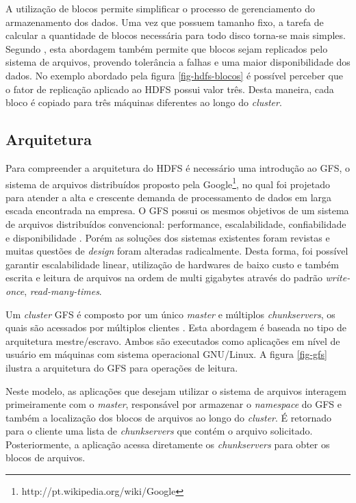 A utilização de blocos permite simplificar o processo de gerenciamento do armazenamento dos dados. Uma vez que possuem tamanho fixo, a tarefa de calcular a quantidade de blocos necessária para todo disco torna-se mais simples. Segundo , esta abordagem também permite que blocos sejam replicados pelo sistema de arquivos, provendo tolerância a falhas e uma maior disponibilidade dos dados. No exemplo abordado pela figura \ref{fig-hdfs-blocos} é possível perceber que o fator de replicação aplicado ao HDFS possui valor três. Desta maneira, cada bloco é copiado para três máquinas diferentes ao longo do \textit{cluster}.

\subsection{Arquitetura}
\label{sec-hdfs-arquitetura}

Para compreender a arquitetura do HDFS é necessário uma introdução ao GFS, o sistema de arquivos distribuídos proposto pela Google\footnote{http://pt.wikipedia.org/wiki/Google}, no qual foi projetado para atender a alta e crescente demanda de processamento de dados em larga escada encontrada na empresa. O GFS possui os mesmos objetivos de um sistema de arquivos distribuídos convencional: performance, escalabilidade, confiabilidade e disponibilidade \cite{ghemawatGfs2003}. Porém as soluções dos sistemas existentes foram revistas e muitas questões de \textit{design} foram alteradas radicalmente. Desta forma, foi possível garantir escalabilidade linear, utilização de hardwares de baixo custo e também escrita e leitura de arquivos na ordem de multi gigabytes através do padrão \textit{write-once}, \textit{read-many-times}. 

Um \textit{cluster} GFS é composto por um único \textit{master} e múltiplos \textit{chunkservers}, os quais são acessados por múltiplos clientes \cite{ghemawatGfs2003}. Esta abordagem é baseada no tipo de arquitetura mestre/escravo. Ambos são executados como aplicações em nível de usuário em máquinas com sistema operacional GNU/Linux. A figura \ref{fig-gfs} ilustra a arquitetura do GFS para operações de leitura.

Neste modelo, as aplicações que desejam utilizar o sistema de arquivos interagem primeiramente com o \textit{master}, responsável por armazenar o \textit{namespace} do GFS e também a localização dos blocos de arquivos ao longo do \textit{cluster}. É retornado para o cliente uma lista de \textit{chunkservers} que contém o arquivo solicitado. Posteriormente, a aplicação acessa diretamente os \textit{chunkservers} para obter os blocos de arquivos.

